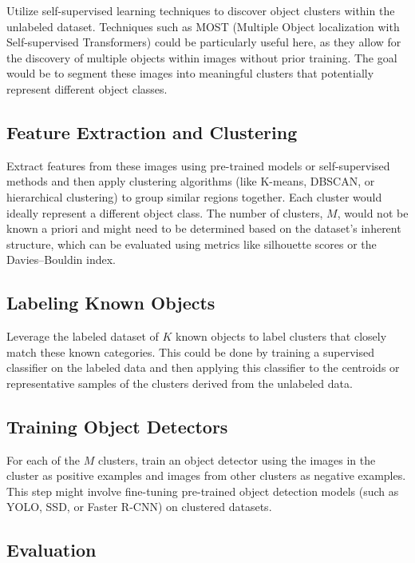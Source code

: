 \documentclass{article}
\begin{document}
	
	Utilize self-supervised learning techniques to discover object clusters within the unlabeled dataset. Techniques such as MOST (Multiple Object localization with Self-supervised Transformers) could be particularly useful here, as they allow for the discovery of multiple objects within images without prior training. The goal would be to segment these images into meaningful clusters that potentially represent different object classes.
	
	\subsection{Feature Extraction and Clustering} 
	
	
	Extract features from these images using pre-trained models or self-supervised methods and then apply clustering algorithms (like K-means, DBSCAN, or hierarchical clustering) to group similar regions together. Each cluster would ideally represent a different object class. The number of clusters, $M$, would not be known a priori and might need to be determined based on the dataset's inherent structure, which can be evaluated using metrics like silhouette scores or the Davies–Bouldin index.
	
	\subsection{Labeling Known Objects}
	
	
	Leverage the labeled dataset of $K$ known objects to label clusters that closely match these known categories. This could be done by training a supervised classifier on the labeled data and then applying this classifier to the centroids or representative samples of the clusters derived from the unlabeled data.
	
	\subsection{Training Object Detectors}
	
	
	For each of the $M$ clusters, train an object detector using the images in the cluster as positive examples and images from other clusters as negative examples. This step might involve fine-tuning pre-trained object detection models (such as YOLO, SSD, or Faster R-CNN) on clustered datasets.
	
	\subsection{Evaluation}
	
\end{document}
